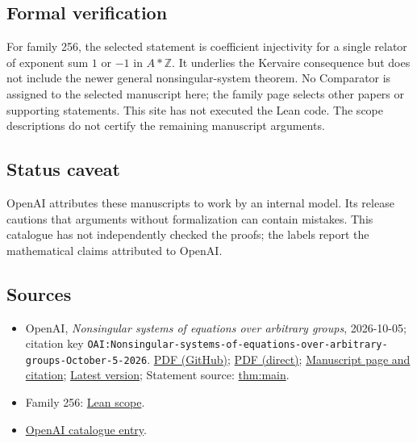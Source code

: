 \documentclass[11pt]{article}
\begin{document}
\subsection{Formal verification}
For family 256, the selected statement is coefficient injectivity for a single relator of exponent sum $1$ or $-1$ in $A*\mathbb Z$. It underlies the Kervaire consequence but does not include the newer general nonsingular-system theorem. No Comparator is assigned to the selected manuscript here; the family page selects other papers or supporting statements. This site has not executed the Lean code. The scope descriptions do not certify the remaining manuscript arguments.

\subsection{Status caveat}
OpenAI attributes these manuscripts to work by an internal model. Its release cautions that arguments without formalization can contain mistakes. This catalogue has not independently checked the proofs; the labels report the mathematical claims attributed to OpenAI.

\subsection{Sources}
\begin{itemize}
\item OpenAI, \emph{Nonsingular systems of equations over arbitrary groups}, 2026-10-05; citation key \texttt{OAI:Nonsingular-systems-of-equations-over-arbitrary-groups-October-5-2026}. \href{https://github.com/openai/math/blob/adc7f1241b42e322a6451854ab7e4b4c146bf78a/preprints/Nonsingular-systems-of-equations-over-arbitrary-groups-October-5-2026/nonsingular-systems-over-arbitrary-groups.pdf}{PDF (GitHub)}; \href{https://github.com/openai/math/raw/adc7f1241b42e322a6451854ab7e4b4c146bf78a/preprints/Nonsingular-systems-of-equations-over-arbitrary-groups-October-5-2026/nonsingular-systems-over-arbitrary-groups.pdf}{PDF (direct)}; \href{https://github.com/openai/math/blob/adc7f1241b42e322a6451854ab7e4b4c146bf78a/preprints/Nonsingular-systems-of-equations-over-arbitrary-groups-October-5-2026/README.md}{Manuscript page and citation}; \href{https://github.com/openai/math/blob/main/preprints/Nonsingular-systems-of-equations-over-arbitrary-groups-October-5-2026/nonsingular-systems-over-arbitrary-groups.pdf}{Latest version}; Statement source: \href{https://github.com/openai/math/blob/adc7f1241b42e322a6451854ab7e4b4c146bf78a/preprints/Nonsingular-systems-of-equations-over-arbitrary-groups-October-5-2026/build/sections/introduction.tex\#L27}{thm:main}.
\item Family 256: \href{https://github.com/openai/math/blob/adc7f1241b42e322a6451854ab7e4b4c146bf78a/lean/docs/256.md}{Lean scope}.
\item \href{https://github.com/openai/math/blob/adc7f1241b42e322a6451854ab7e4b4c146bf78a/CONTENTS.md}{OpenAI catalogue entry}.
\end{itemize}
\end{document}
